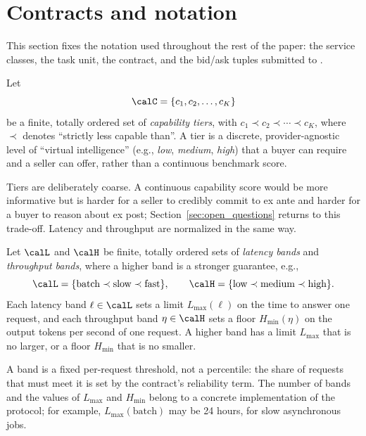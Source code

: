 \section{Contracts and notation}
\label{sec:contracts_and_notation}

This section fixes the notation used throughout the rest of the paper: the
service classes, the task unit, the contract, and the bid/ask tuples
submitted to \NoesisMarket.

\begin{definition}
\label{def:capability_tiers}
Let
$$
  \calC = \{ c_1, c_2, \ldots, c_K \}
$$
be a finite, totally ordered set of \emph{capability tiers}, with
$c_1 \prec c_2 \prec \cdots \prec c_K$, where $\prec$ denotes ``strictly
less capable than''. A tier is a discrete, provider-agnostic level of
``virtual intelligence'' (e.g., \emph{low}, \emph{medium}, \emph{high}) that
a buyer can require and a seller can offer, rather than a continuous
benchmark score.
\end{definition}

Tiers are deliberately coarse. A continuous capability score would be more
informative but is harder for a seller to credibly commit to ex ante and
harder for a buyer to reason about ex post; Section~\ref{sec:open_questions}
returns to this trade-off. Latency and throughput are normalized in the same
way.

\begin{definition}
\label{def:bands}
Let $\calL$ and $\calH$ be finite, totally ordered sets of \emph{latency
bands} and \emph{throughput bands}, where a higher band is a stronger
guarantee, e.g.,
$$
  \calL = \{ \text{batch} \prec \text{slow} \prec \text{fast} \},
  \qquad
  \calH = \{ \text{low} \prec \text{medium} \prec \text{high} \}.
$$
Each latency band $\ell \in \calL$ sets a limit $L_{\max}(\ell)$ on the time
to answer one request, and each throughput band $\eta \in \calH$ sets a floor
$H_{\min}(\eta)$ on the output tokens per second of one request. A higher
band has a limit $L_{\max}$ that is no larger, or a floor $H_{\min}$ that is
no smaller.
\end{definition}

A band is a fixed per-request threshold, not a percentile: the share of
requests that must meet it is set by the contract's reliability term. The
number of bands and the values of $L_{\max}$ and $H_{\min}$ belong to a
concrete implementation of the protocol; for example,
$L_{\max}(\text{batch})$ may be 24 hours, for slow asynchronous jobs.

